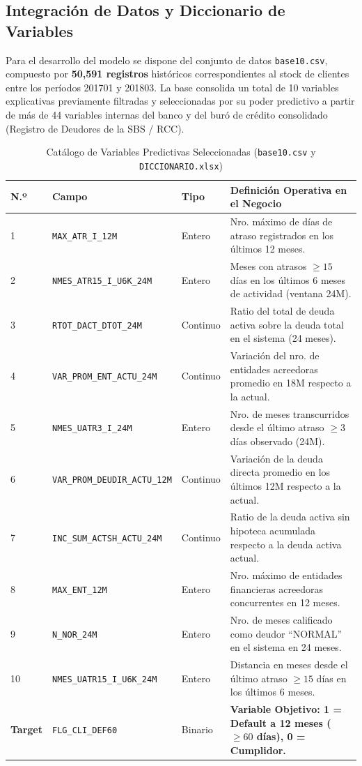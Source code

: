 \documentclass[11pt,a4paper]{article}
\begin{document}
\subsection{Integración de Datos y Diccionario de Variables}
Para el desarrollo del modelo se dispone del conjunto de datos \texttt{base10.csv}, compuesto por \textbf{50,591 registros} históricos correspondientes al stock de clientes entre los períodos 201701 y 201803. La base consolida un total de 10 variables explicativas previamente filtradas y seleccionadas por su poder predictivo a partir de más de 44 variables internas del banco y del buró de crédito consolidado (Registro de Deudores de la SBS / RCC).

\begin{table}[H]
\centering
\small
\caption{Catálogo de Variables Predictivas Seleccionadas (\texttt{base10.csv} y \texttt{DICCIONARIO.xlsx})}
\label{tab:catalogo_vars}
\begin{tabular}{lllp{7.2cm}}
\toprule
\textbf{N.º} & \textbf{Campo} & \textbf{Tipo} & \textbf{Definición Operativa en el Negocio} \\
\midrule
1 & \texttt{MAX\_ATR\_I\_12M} & Entero & Nro. máximo de días de atraso registrados en los últimos 12 meses. \\
2 & \texttt{NMES\_ATR15\_I\_U6K\_24M} & Entero & Meses con atrasos $\ge 15$ días en los últimos 6 meses de actividad (ventana 24M). \\
3 & \texttt{RTOT\_DACT\_DTOT\_24M} & Continuo & Ratio del total de deuda activa sobre la deuda total en el sistema (24 meses). \\
4 & \texttt{VAR\_PROM\_ENT\_ACTU\_24M} & Continuo & Variación del nro. de entidades acreedoras promedio en 18M respecto a la actual. \\
5 & \texttt{NMES\_UATR3\_I\_24M} & Entero & Nro. de meses transcurridos desde el último atraso $\ge 3$ días observado (24M). \\
6 & \texttt{VAR\_PROM\_DEUDIR\_ACTU\_12M} & Continuo & Variación de la deuda directa promedio en los últimos 12M respecto a la actual. \\
7 & \texttt{INC\_SUM\_ACTSH\_ACTU\_24M} & Continuo & Ratio de la deuda activa sin hipoteca acumulada respecto a la deuda activa actual. \\
8 & \texttt{MAX\_ENT\_12M} & Entero & Nro. máximo de entidades financieras acreedoras concurrentes en 12 meses. \\
9 & \texttt{N\_NOR\_24M} & Entero & Nro. de meses calificado como deudor ``NORMAL'' en el sistema en 24 meses. \\
10 & \texttt{NMES\_UATR15\_I\_U6K\_24M} & Entero & Distancia en meses desde el último atraso $\ge 15$ días en los últimos 6 meses. \\
\midrule
\textbf{Target} & \texttt{FLG\_CLI\_DEF60} & Binario & \textbf{Variable Objetivo: 1 = Default a 12 meses ($\ge 60$ días), 0 = Cumplidor.} \\
\bottomrule
\end{tabular}
\end{table}
\end{document}
